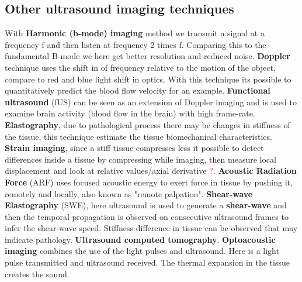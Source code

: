	\subsection*{Other ultrasound imaging techniques}
	With \textbf{Harmonic (b-mode) imaging} method we transmit a signal at a frequency f and then listen at frequency 2 times f. Comparing this to the fundamental B-mode we here get better resolution and reduced noise. \textbf{Doppler} technique uses the shift in of frequency relative to the motion of the object, compare to red and blue light shift in optics. With this technique its possible to quantitatively predict the blood flow velocity for an example. \textbf{Functional ultrasound} (fUS) can be seen as an extension of Doppler imaging and is used to examine brain activity (blood flow in the brain) with high frame-rate. \textbf{Elastography}, due to pathological process there may be changes in stiffness of the tissue, this technique estimate the tissue biomechanical characteristics. \textbf{Strain imaging}, since a stiff tissue compresses less it possible to detect differences inside a tissue by compressing while imaging, then measure local displacement and look at relative values/axial derivative \textcolor{red}{?}. \textbf{Acoustic Radiation Force} (ARF) uses focused acoustic energy to exert force in tissue by pushing it, remotely and locally, also known as "remote palpation". \textbf{Shear-wave Elastography} (SWE), here ultrasound is used to generate a \textbf{shear-wave} and then the temporal propagation is observed on consecutive ultrasound frames to infer the shear-wave speed. Stiffness difference in tissue can be observed that may indicate pathology. \textbf{Ultrasound computed tomography}. \textbf{Optoacoustic imaging} combines the use of the light pulses and ultrasound. Here is a light pulse transmitted and ultrasound received. The thermal expansion in the tissue creates the sound.  
















	



